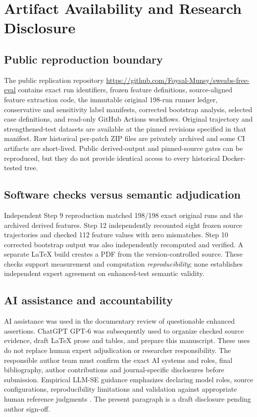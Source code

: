 \section{Artifact Availability and Research Disclosure}\label{sec:replication}
\subsection{Public reproduction boundary}
The public replication repository \url{https://github.com/Foysal-Munsy/sweabs-free-eval} contains exact run identifiers, frozen feature definitions, source-aligned feature extraction code, the immutable original 198-run runner ledger, conservative and sensitivity label manifests, corrected bootstrap analysis, selected case definitions, and read-only GitHub Actions workflows. Original trajectory and strengthened-test datasets are available at the pinned revisions specified in that manifest. Raw historical per-patch ZIP files are privately archived and some CI artifacts are short-lived. Public derived-output and pinned-source gates can be reproduced, but they do not provide identical access to every historical Docker-tested tree.

\subsection{Software checks versus semantic adjudication}
Independent Step 9 reproduction matched 198/198 exact original runs and the archived derived features. Step 12 independently recounted eight frozen source trajectories and checked 112 feature values with zero mismatches. Step 10 corrected bootstrap output was also independently recomputed and verified. A separate LaTeX build creates a PDF from the version-controlled source. These checks support measurement and computation \emph{reproducibility}; none establishes independent expert agreement on enhanced-test semantic validity.

\subsection{AI assistance and accountability}
AI assistance was used in the documentary review of questionable enhanced assertions. ChatGPT GPT-6 was subsequently used to organize checked source evidence, draft LaTeX prose and tables, and prepare this manuscript. These uses do not replace human expert adjudication or researcher responsibility. The responsible author team must confirm the exact AI systems and roles, final bibliography, author contributions and journal-specific disclosures before submission. Empirical LLM-SE guidance emphasizes declaring model roles, source configurations, reproducibility limitations and validation against appropriate human reference judgments \cite{baltes2026guidelines}. The present paragraph is a draft disclosure pending author sign-off.
